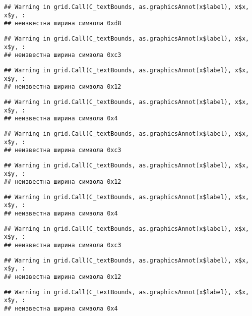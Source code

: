 \documentclass[
]{article}
\begin{document}
\begin{verbatim}
## Warning in grid.Call(C_textBounds, as.graphicsAnnot(x$label), x$x, x$y, :
## неизвестна ширина символа 0xd8
\end{verbatim}

\begin{verbatim}
## Warning in grid.Call(C_textBounds, as.graphicsAnnot(x$label), x$x, x$y, :
## неизвестна ширина символа 0xc3
\end{verbatim}

\begin{verbatim}
## Warning in grid.Call(C_textBounds, as.graphicsAnnot(x$label), x$x, x$y, :
## неизвестна ширина символа 0x12
\end{verbatim}

\begin{verbatim}
## Warning in grid.Call(C_textBounds, as.graphicsAnnot(x$label), x$x, x$y, :
## неизвестна ширина символа 0x4
\end{verbatim}

\begin{verbatim}
## Warning in grid.Call(C_textBounds, as.graphicsAnnot(x$label), x$x, x$y, :
## неизвестна ширина символа 0xc3
\end{verbatim}

\begin{verbatim}
## Warning in grid.Call(C_textBounds, as.graphicsAnnot(x$label), x$x, x$y, :
## неизвестна ширина символа 0x12
\end{verbatim}

\begin{verbatim}
## Warning in grid.Call(C_textBounds, as.graphicsAnnot(x$label), x$x, x$y, :
## неизвестна ширина символа 0x4
\end{verbatim}

\begin{verbatim}
## Warning in grid.Call(C_textBounds, as.graphicsAnnot(x$label), x$x, x$y, :
## неизвестна ширина символа 0xc3
\end{verbatim}

\begin{verbatim}
## Warning in grid.Call(C_textBounds, as.graphicsAnnot(x$label), x$x, x$y, :
## неизвестна ширина символа 0x12
\end{verbatim}

\begin{verbatim}
## Warning in grid.Call(C_textBounds, as.graphicsAnnot(x$label), x$x, x$y, :
## неизвестна ширина символа 0x4
\end{verbatim}
\end{document}
